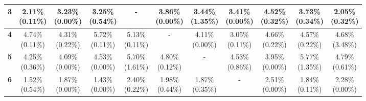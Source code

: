 \documentclass{report}
\begin{document}
\begin{center}
{\begin{tabular}{|c|c|c|c|c|c|c|c|c|c|c|}
  \textbf{3} & \makecell{2.11\% \\ (0.11\%)} & \makecell{3.23\% \\ (0.00\%)} & \makecell{3.25\% \\ (0.54\%)} & - & \makecell{3.86\% \\ (0.00\%)} & \makecell{3.44\% \\ (1.35\%)} & \makecell{3.41\% \\ (0.00\%)} & \makecell{4.52\% \\ (0.32\%)} & \makecell{3.73\% \\ (0.34\%)} & \makecell{2.05\% \\ (0.32\%)} \\ \hline
  \textbf{4} & \makecell{4.74\% \\ (0.11\%)} & \makecell{4.31\% \\ (0.22\%)} & \makecell{5.72\% \\ (0.11\%)} & \makecell{5.13\% \\ (0.11\%)} & - & \makecell{4.11\% \\ (0.00\%)} & \makecell{3.05\% \\ (0.11\%)} & \makecell{4.66\% \\ (0.22\%)} & \makecell{4.57\% \\ (0.22\%)} & \makecell{4.68\% \\ (3.48\%)} \\ \hline
  \textbf{5} & \makecell{4.25\% \\ (0.36\%)} & \makecell{4.09\% \\ (0.00\%)} & \makecell{4.53\% \\ (0.00\%)} & \makecell{5.70\% \\ (1.61\%)} & \makecell{4.80\% \\ (0.12\%)} & - & \makecell{4.53\% \\ (0.86\%)} & \makecell{3.95\% \\ (0.00\%)} & \makecell{5.77\% \\ (1.35\%)} & \makecell{4.79\% \\ (0.61\%)} \\ \hline
  \textbf{6} & \makecell{1.52\% \\ (0.54\%)} & \makecell{1.87\% \\ (0.00\%)} & \makecell{1.43\% \\ (0.00\%)} & \makecell{2.40\% \\ (0.22\%)} & \makecell{1.98\% \\ (0.44\%)} & \makecell{1.87\% \\ (0.35\%)} & - & \makecell{2.51\% \\ (0.00\%)} & \makecell{1.84\% \\ (0.11\%)} & \makecell{2.28\% \\ (0.00\%)} \\ \hline

\end{tabular}}
\end{center}
\end{document}
